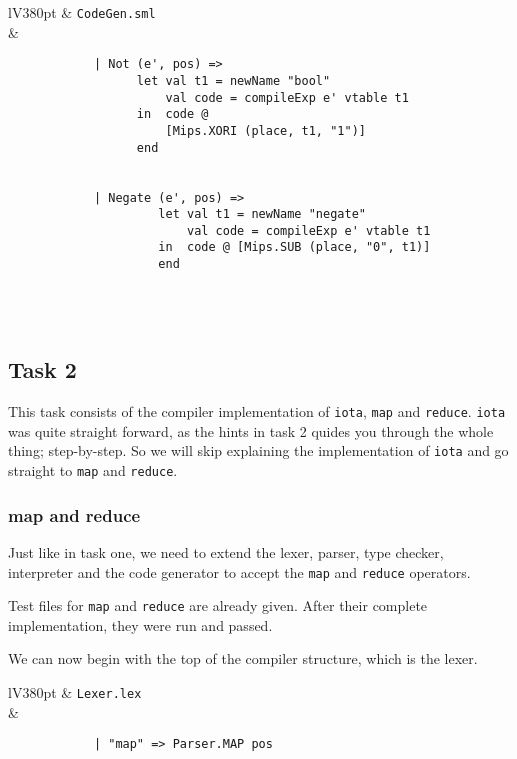 \documentclass[a4paper]{article}
\begin{document}
\begin{center}	
	\begin{tabular}{lV{380pt}}
		\toprule
		& \verb|CodeGen.sml|\\
		\midrule
		&
		\begin{verbatim}
			| Not (e', pos) =>
			      let val t1 = newName "bool"
			          val code = compileExp e' vtable t1
			      in  code @ 
			          [Mips.XORI (place, t1, "1")]
			      end
			
			
			| Negate (e', pos) =>
			         let val t1 = newName "negate"
			             val code = compileExp e' vtable t1
			         in  code @ [Mips.SUB (place, "0", t1)]
			         end
		\end{verbatim}
		\\
		\bottomrule \\
	\end{tabular}
\end{center}

\subsection{Task 2}
This task consists of the compiler implementation of \verb|iota|, \verb|map| and \verb|reduce|. \verb|iota| was quite straight forward, as the hints in task 2 quides you through the whole thing; step-by-step. So we will skip explaining the implementation of \verb|iota| and go straight to \verb|map| and \verb|reduce|.

\subsubsection{map and reduce}
Just like in task one, we need to extend the lexer, parser, type checker, interpreter and the code generator to accept the \verb|map| and \verb|reduce| operators.
	
Test files for \verb|map| and \verb|reduce| are already given. After their complete implementation, they were run and passed.
	
We can now begin with the top of the compiler structure, which is the lexer.
	
\begin{center}	
	\begin{tabular}{lV{380pt}}
		\toprule
		& \verb|Lexer.lex|\\
		\midrule
		&
		\begin{verbatim}
			| "map" => Parser.MAP pos
		\end{verbatim}
		\\
		\bottomrule \\
	\end{tabular}
\end{center}
\end{document}
